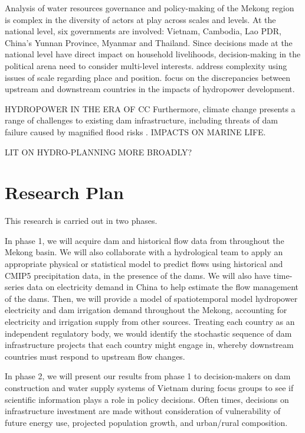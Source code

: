 \documentclass[11pt,english]{article}
\theoremstyle{plain} \newtheorem{claim}{Claim}
\theoremstyle{plain} \newtheorem{prop}{Proposition}
\theoremstyle{plain} \newtheorem{hypo}{Hypothesis}
\begin{document}
Analysis of water resources governance and policy-making of the Mekong region is complex in the diversity of actors at play across scales and levels. At the national level, six governments are involved: Vietnam, Cambodia, Lao PDR, China's Yunnan Province, Myanmar and Thailand. Since decisions made at the national level have direct impact on household livelihoods, decision-making in the political arena need to consider multi-level interests. \citet{Lebel2005} address complexity using issues of scale regarding place and position. \citet{Kuenzer2012SS} focus on the discrepancies between upstream and downstream countries in the impacts of hydropower development. 

HYDROPOWER IN THE ERA OF CC 
Furthermore, climate change presents a range of challenges to existing dam infrastructure, including threats of dam failure caused by magnified flood risks \citep{Pittock:2011fv}.  IMPACTS ON MARINE LIFE.    

LIT ON HYDRO-PLANNING MORE BROADLY? 

\section{Research Plan}

This research is carried out in two phases. 

In phase 1, we will acquire dam and historical flow data from throughout the Mekong basin. We will also collaborate with a hydrological team to apply an appropriate physical or statistical model to predict flows using historical and CMIP5 precipitation data, in the presence of the dams.  We will also have time-series data on electricity demand in China to help estimate the flow management of the dams. Then, we will provide a model of spatiotemporal model hydropower electricity and dam irrigation demand throughout the Mekong, accounting for electricity and irrigation supply from other sources.  Treating each country as an independent regulatory body, we would identify the stochastic sequence of dam infrastructure projects that each country might engage in, whereby downstream countries must respond to upstream flow changes.

In phase 2, we will present our results from phase 1 to decision-makers on dam construction and water supply systems of Vietnam during focus groups to see if scientific information plays a role in policy decisions. Often times, decisions on infrastructure investment are made without consideration of vulnerability of future energy use, projected population growth, and urban/rural composition.  
\end{document}
